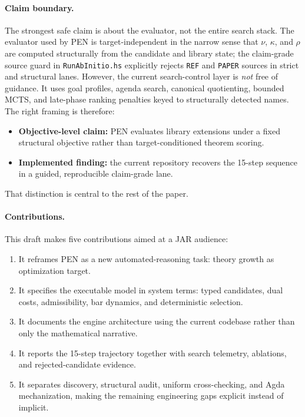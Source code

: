 \documentclass[11pt,a4paper]{article}
\begin{document}
\paragraph{Claim boundary.}
The strongest safe claim is about the evaluator, not the entire search stack. The evaluator used by PEN is target-independent in the narrow sense that $\nu$, $\kappa$, and $\rho$ are computed structurally from the candidate and library state; the claim-grade source guard in \texttt{RunAbInitio.hs} explicitly rejects \texttt{REF} and \texttt{PAPER} sources in strict and structural lanes. However, the current search-control layer is \emph{not} free of guidance. It uses goal profiles, agenda search, canonical quotienting, bounded MCTS, and late-phase ranking penalties keyed to structurally detected names. The right framing is therefore:
\begin{itemize}[nosep]
  \item \textbf{Objective-level claim:} PEN evaluates library extensions under a fixed structural objective rather than target-conditioned theorem scoring.
  \item \textbf{Implemented finding:} the current repository recovers the 15-step sequence in a guided, reproducible claim-grade lane.
\end{itemize}
That distinction is central to the rest of the paper.

\paragraph{Contributions.}
This draft makes five contributions aimed at a JAR audience:
\begin{enumerate}[nosep]
  \item It reframes PEN as a new automated-reasoning task: theory growth as optimization target.
  \item It specifies the executable model in system terms: typed candidates, dual costs, admissibility, bar dynamics, and deterministic selection.
  \item It documents the engine architecture using the current codebase rather than only the mathematical narrative.
  \item It reports the 15-step trajectory together with search telemetry, ablations, and rejected-candidate evidence.
  \item It separates discovery, structural audit, uniform cross-checking, and Agda mechanization, making the remaining engineering gaps explicit instead of implicit.
\end{enumerate}
\end{document}
